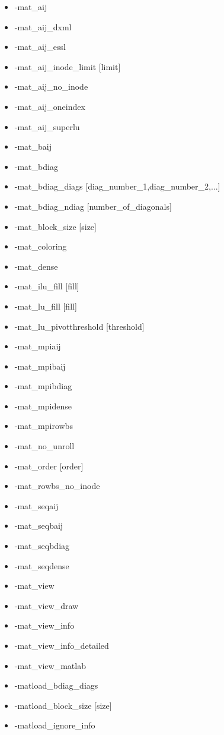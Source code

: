 \begin{itemize}
\item -mat\_aij
\item -mat\_aij\_dxml
\item -mat\_aij\_essl
\item -mat\_aij\_inode\_limit [limit]
\item -mat\_aij\_no\_inode
\item -mat\_aij\_oneindex
\item -mat\_aij\_superlu
\item -mat\_baij
\item -mat\_bdiag
\item -mat\_bdiag\_diags [diag\_number\_1,diag\_number\_2,...]
\item -mat\_bdiag\_ndiag [number\_of\_diagonals]
\item -mat\_block\_size [size]
\item -mat\_coloring
\item -mat\_dense
\item -mat\_ilu\_fill [fill]
\item -mat\_lu\_fill [fill]
\item -mat\_lu\_pivotthreshold [threshold]
\item -mat\_mpiaij
\item -mat\_mpibaij
\item -mat\_mpibdiag
\item -mat\_mpidense
\item -mat\_mpirowbs
\item -mat\_no\_unroll
\item -mat\_order [order]
\item -mat\_rowbs\_no\_inode
\item -mat\_seqaij
\item -mat\_seqbaij
\item -mat\_seqbdiag
\item -mat\_seqdense
\item -mat\_view
\item -mat\_view\_draw
\item -mat\_view\_info
\item -mat\_view\_info\_detailed
\item -mat\_view\_matlab
\item -matload\_bdiag\_diags 
\item -matload\_block\_size [size]
\item -matload\_ignore\_info
\end{itemize}

